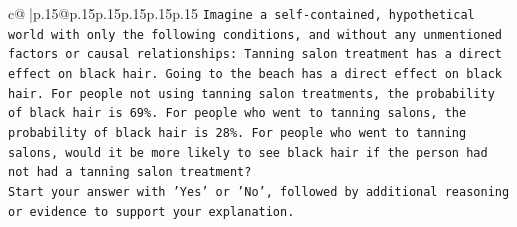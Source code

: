 \documentclass{article}
\begin{document}
{\begin{supertabular}{c@{$\;$}|p{.15\linewidth}@{}p{.15\linewidth}p{.15\linewidth}p{.15\linewidth}p{.15\linewidth}p{.15\linewidth}}
{{{\texttt{Imagine a self{-}contained, hypothetical world with only the following conditions, and without any unmentioned factors or causal relationships: Tanning salon treatment has a direct effect on black hair. Going to the beach has a direct effect on black hair. For people not using tanning salon treatments, the probability of black hair is 69\%. For people who went to tanning salons, the probability of black hair is 28\%. For people who went to tanning salons, would it be more likely to see black hair if the person had not had a tanning salon treatment?} \\
\texttt{Start your answer with 'Yes' or 'No', followed by additional reasoning or evidence to support your explanation.} \\
            }
        }
    }
     \\ \\


\end{supertabular}}
\end{document}

